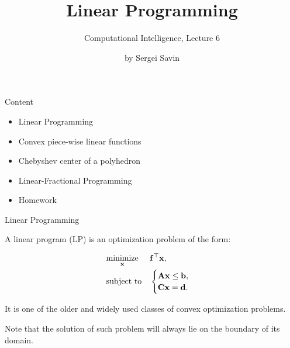 \documentclass{beamer}
\title{Linear Programming}
\subtitle{Computational Intelligence, Lecture 6}
\author{by Sergei Savin}
\date{\mydate}
\begin{document}
\maketitle


\begin{frame}{Content}

\begin{itemize}
\item Linear Programming
\item Convex piece-wise linear functions
\item Chebyshev center of a polyhedron
\item Linear-Fractional Programming
\item Homework
\end{itemize}

\end{frame}



\begin{frame}{Linear Programming}
\begin{flushleft}

A linear program (LP) is an optimization problem of the form:

\begin{equation} \label{LP}
	\begin{aligned}
		& \underset{\mathbf{x}}{\text{minimize}}
		& & \mathbf{f}^\top \mathbf{x} , \\
		& \text{subject to}
		& & \begin{cases} 
			\mathbf{A}\mathbf{x} \leq \mathbf{b}, \\
			\mathbf{C}\mathbf{x} = \mathbf{d}.
		\end{cases}
	\end{aligned}
\end{equation}

It is one of the older and widely used classes of convex optimization problems. 

\bigskip

Note that the solution of such problem will always lie on the boundary of its domain.
 
\end{flushleft}
\end{frame}
\end{document}

